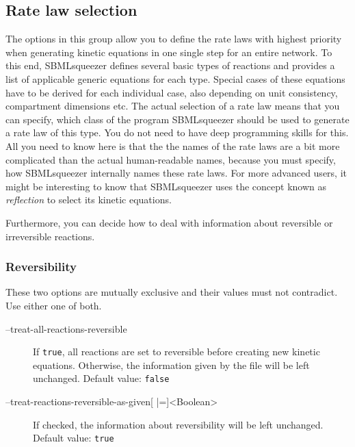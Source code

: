 \subsection{Rate law selection}
\label{sec:Rate_law_selection}
The options in this group allow you to define the rate laws with highest
priority when generating kinetic equations in one single step for an entire
network.
To this end, SBMLsqueezer defines several basic types of reactions and provides
a list of applicable generic equations for each type. Special cases of these
equations have to be derived for each individual case, also depending on
unit consistency, compartment dimensions etc.
The actual selection of a rate law means that you can specify, which class of
the program SBMLsqueezer should be used to generate a rate law of this type.
You do not need to have deep programming skills for this. All you need to know
here is that the the names of the rate laws are a bit more complicated than the
actual human-readable names, because you must specify, how SBMLsqueezer
internally names these rate laws. For more advanced users, it might be
interesting to know that SBMLsqueezer uses the concept known as \emph{reflection} to
select its kinetic equations.

Furthermore, you can decide how to deal with information about reversible or
irreversible reactions.

\subsubsection{Reversibility}

These two options are mutually exclusive and their values must not contradict.
Use either one of both.
\begin{description}
\item[--treat-all-reactions-reversible]
  If \texttt{true}, all reactions are set to reversible before creating
  new kinetic equations. Otherwise, the information given by the
  \SBML file will be left unchanged.
  Default value: \texttt{false}

\item[--treat-reactions-reversible-as-given{[} |={]}<Boolean>]
  If checked, the information about reversibility will be left unchanged.
  Default value: \texttt{true}
\end{description}

